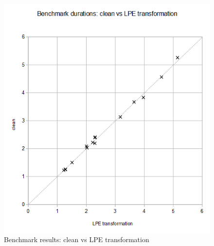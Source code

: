 \begin{figure}[!ht]
\begin{center}
\includegraphics[width=0.5\linewidth]{charts/clean-vs-lpe-only}
\caption{Benchmark results: clean vs LPE transformation}
\label{clean-vs-lpe-only:fig}
\end{center}
\end{figure}



